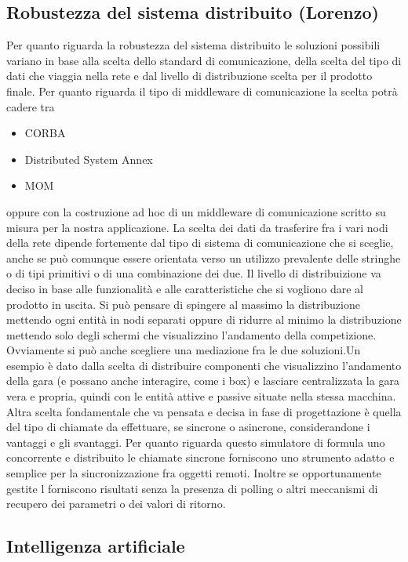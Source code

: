 \subsection{Robustezza del sistema distribuito (Lorenzo)}
Per quanto riguarda la robustezza del sistema distribuito le soluzioni possibili
variano in base alla scelta dello standard di comunicazione, della scelta del
tipo di dati che viaggia nella rete e dal livello di distribuzione scelta per il
prodotto finale.
Per quanto riguarda il tipo di middleware di comunicazione la scelta potr\`{a}
cadere tra 
\begin{itemize}
\item CORBA
\item Distributed System Annex 
\item MOM
\end{itemize}
oppure con la costruzione ad hoc di un middleware di comunicazione scritto su
misura per la nostra applicazione.
La scelta dei dati da trasferire fra i vari nodi della rete dipende fortemente
dal tipo di sistema di comunicazione che si sceglie, anche se può comunque
essere orientata verso un utilizzo prevalente delle stringhe o di tipi primitivi
o di una combinazione dei due. Il livello di distribuizione va deciso in base
alle funzionalit\`{a} e alle caratteristiche che si vogliono dare al prodotto in
uscita. Si può pensare di spingere al massimo la distribuzione mettendo ogni
entit\`{a} in nodi separati oppure di ridurre al minimo la distribuzione
mettendo solo degli schermi che visualizzino l'andamento della competizione.
Ovviamente si pu\`{o} anche scegliere una mediazione fra le due soluzioni.Un
esempio \`{e} dato dalla scelta di distribuire componenti che visualizzino
l'andamento della gara (e possano anche interagire, come i box) e lasciare
centralizzata la gara vera e propria, quindi con le entit\`{a} attive e passive
situate nella stessa macchina. Altra scelta fondamentale che va pensata e decisa
in fase di progettazione \`{e} quella del tipo di chiamate da effettuare, se
sincrone o asincrone, considerandone i vantaggi e gli svantaggi. Per quanto
riguarda questo simulatore di formula uno concorrente e distribuito le chiamate
sincrone forniscono uno strumento adatto e semplice per la sincronizzazione fra
oggetti remoti. Inoltre se opportunamente gestite l forniscono risultati senza
la presenza di polling o altri meccanismi di recupero dei parametri o dei valori
di ritorno.
\subsection{Intelligenza artificiale}
